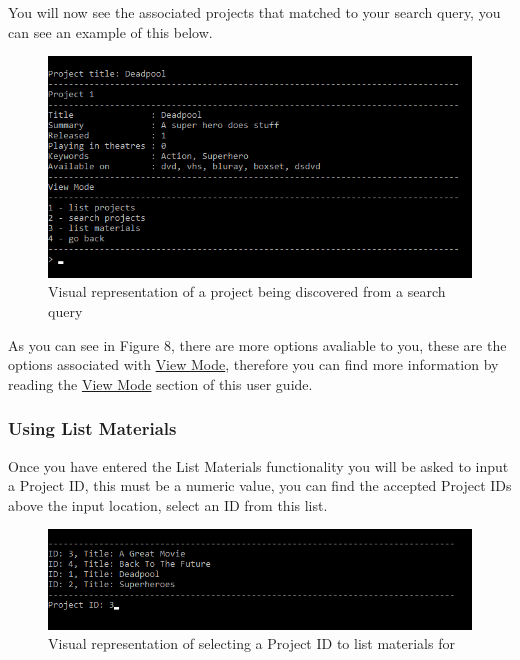 \documentclass[
  english,
  a4paper,
,tablecaptionabove
]{scrartcl}
\begin{document}
You will now see the associated projects that matched to your search
query, you can see an example of this below.

\begin{figure}
\centering
\includegraphics{images/user-guide/view-mode/project-search-term.png}
\caption{Visual representation of a project being discovered from a
search query}
\end{figure}

As you can see in Figure 8, there are more options avaliable to you,
these are the options associated with
\protect\hyperlink{using-view-mode}{View Mode}, therefore you can find
more information by reading the \protect\hyperlink{using-view-mode}{View
Mode} section of this user guide.

\newpage

\hypertarget{using-list-materials}{%
\subsubsection{Using List Materials}\label{using-list-materials}}

Once you have entered the List Materials functionality you will be asked
to input a Project ID, this must be a numeric value, you can find the
accepted Project IDs above the input location, select an ID from this
list.

\begin{figure}
\centering
\includegraphics{images/user-guide/view-mode/list-materials-project-id.png}
\caption{Visual representation of selecting a Project ID to list
materials for}
\end{figure}
\end{document}
